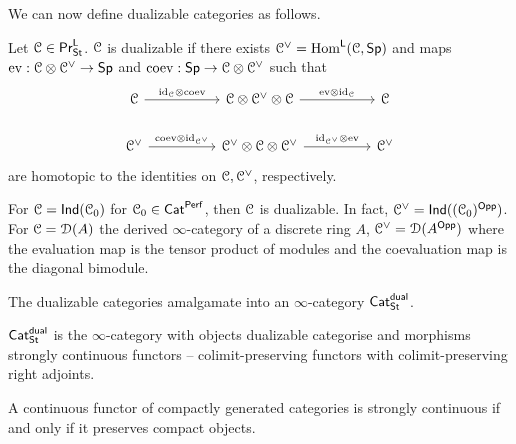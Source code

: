 We can now define dualizable categories as follows. 
\begin{definition}
    Let $\EuScript{C}\in\mathsf{Pr}^{\mathsf{L}}_{\mathsf{St}}$. $\EuScript{C}$ is dualizable if there exists $\EuScript{C}^{\vee}=\mathrm{Hom}^{\mathsf{L}}(\EuScript{C},\mathsf{Sp})$ and maps $\mathrm{ev}:\EuScript{C}\otimes\EuScript{C}^{\vee}\to\mathsf{Sp}$ and $\mathrm{coev}:\mathsf{Sp}\to\EuScript{C}\otimes\EuScript{C}^{\vee}$ such that 
    $$%
    \begin{tikzcd}
        \Cscr && {\Cscr\otimes\Cscr^{\vee}\otimes\Cscr} && \Cscr \\
        {\Cscr^{\vee}} && {\Cscr^{\vee}\otimes\Cscr\otimes\Cscr^{\vee}} && {\Cscr^{\vee}}
        \arrow["{\id_{\Cscr}\otimes\coev}", from=1-1, to=1-3]
        \arrow["{\ev\otimes\id_{\Cscr}}", from=1-3, to=1-5]
        \arrow["{\coev\otimes\id_{\Cscr^{\vee}}}", from=2-1, to=2-3]
        \arrow["{\id_{\Cscr^{\vee}}\otimes\ev}", from=2-3, to=2-5]
    \end{tikzcd}$$
    are homotopic to the identities on $\EuScript{C},\EuScript{C}^{\vee}$, respectively. 
\end{definition}
\begin{example}
    For $\EuScript{C}=\mathsf{Ind}(\EuScript{C}_{0})$ for $\EuScript{C}_{0}\in\mathsf{Cat}^{\mathsf{Perf}}$, then $\EuScript{C}$ is dualizable. In fact, $\EuScript{C}^{\vee}=\mathsf{Ind}((\EuScript{C}_{0})^{\mathsf{Opp}})$. For $\EuScript{C}=\EuScript{D}(A)$ the derived $\infty$-category of a discrete ring $A$, $\EuScript{C}^{\vee}=\EuScript{D}(A^{\mathsf{Opp}})$ where the evaluation map is the tensor product of modules and the coevaluation map is the diagonal bimodule. 
\end{example}
The dualizable categories amalgamate into an $\infty$-category $\Cat^{\dual}_{\St}$. 
\begin{definition}[$\Cat^{\dual}_{\St}$]\label{def: dualizable stable categories}
    $\Cat^{\dual}_{\St}$ is the $\infty$-category with objects dualizable categorise and morphisms strongly continuous functors -- colimit-preserving functors with colimit-preserving right adjoints. 
\end{definition}
\begin{remark}
    A continuous functor of compactly generated categories is strongly continuous if and only if it preserves compact objects. 
\end{remark}
